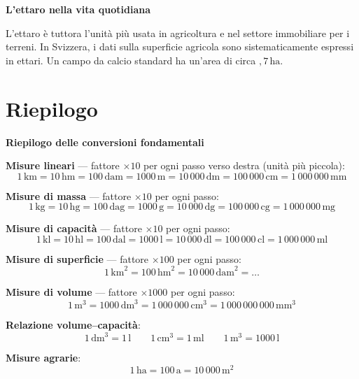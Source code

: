 \begin{sapevi}
    \textbf{L'ettaro nella vita quotidiana}

    L'ettaro è tuttora l'unità più usata in agricoltura e nel settore immobiliare per i terreni. In Svizzera, i dati sulla superficie agricola sono sistematicamente espressi in ettari. Un campo da calcio standard ha un'area di circa ${,}7\,\text{ha}$.
\end{sapevi}

\section{Riepilogo}

\begin{regola}
    \textbf{Riepilogo delle conversioni fondamentali}

    \medskip
    \textbf{Misure lineari} — fattore $\times 10$ per ogni passo verso destra (unità più piccola):
    \[
        1\,\text{km} = 10\,\text{hm} = 100\,\text{dam} = 1000\,\text{m} = 10\,000\,\text{dm} = 100\,000\,\text{cm} = 1\,000\,000\,\text{mm}
    \]

    \medskip
    \textbf{Misure di massa} — fattore $\times 10$ per ogni passo:
    \[
        1\,\text{kg} = 10\,\text{hg} = 100\,\text{dag} = 1000\,\text{g} = 10\,000\,\text{dg} = 100\,000\,\text{cg} = 1\,000\,000\,\text{mg}
    \]

    \medskip
    \textbf{Misure di capacità} — fattore $\times 10$ per ogni passo:
    \[
        1\,\text{kl} = 10\,\text{hl} = 100\,\text{dal} = 1000\,\text{l} = 10\,000\,\text{dl} = 100\,000\,\text{cl} = 1\,000\,000\,\text{ml}
    \]

    \medskip
    \textbf{Misure di superficie} — fattore $\times 100$ per ogni passo:
    \[
        1\,\text{km}^2 = 100\,\text{hm}^2 = 10\,000\,\text{dam}^2 = \ldots
    \]

    \medskip
    \textbf{Misure di volume} — fattore $\times 1000$ per ogni passo:
    \[
        1\,\text{m}^3 = 1000\,\text{dm}^3 = 1\,000\,000\,\text{cm}^3 = 1\,000\,000\,000\,\text{mm}^3
    \]

    \medskip
    \textbf{Relazione volume–capacità}:
    \[
        1\,\text{dm}^3 = 1\,\text{l} \qquad 1\,\text{cm}^3 = 1\,\text{ml} \qquad 1\,\text{m}^3 = 1000\,\text{l}
    \]

    \medskip
    \textbf{Misure agrarie}:
    \[
        1\,\text{ha} = 100\,\text{a} = 10\,000\,\text{m}^2
    \]
\end{regola}
